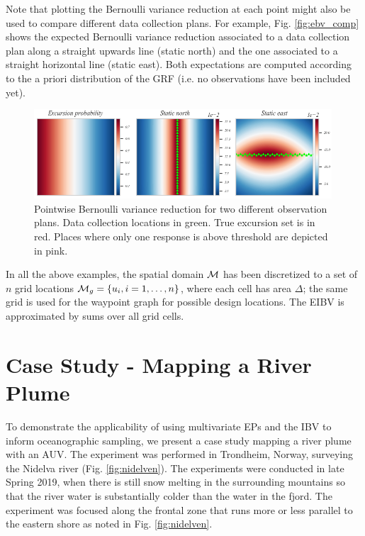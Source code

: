 \documentclass[aoas]{imsart}
\begin{document}
Note that plotting the Bernoulli variance reduction at each point might also be used to compare different data collection plans. For example, Fig. \ref{fig:ebv_comp} shows the expected Bernoulli variance reduction associated to a data collection plan along a straight upwards line (static north) and the one associated to a straight horizontal line (static east). Both expectations are computed according to the a priori distribution of the GRF (i.e. no observations have been included yet).

\begin{figure}[h!] \centering
  \includegraphics[width=0.99\textwidth]{Figures/ebv_north_vs_east.png}
  \caption{Pointwise Bernoulli variance reduction for two different observation plans. Data collection locations in green. True excursion set is in red. Places where only one response is above threshold are depicted in pink.}
\label{fig:ebv_north_vs_east}
\end{figure}

\begin{remark}
In all the above examples, the spatial domain $\mathcal{M}$ has been discretized to a set of $n$ grid
locations $\mathcal{M}_g = \{u_i, i=1,\ldots,n \}$, where each cell
has area $\Delta$; the same grid is used for the waypoint graph for
possible design locations. The EIBV is approximated by sums over all
grid cells.
\end{remark}









\section{Case Study - Mapping a River Plume}
\label{sec:case_study}

To demonstrate the applicability of using multivariate EPs and the IBV
to inform oceanographic sampling, we present a case study mapping a
river plume with an AUV. The experiment was performed in Trondheim,
Norway, surveying the Nidelva river (Fig. \ref{fig:nidelven}). The
experiments were conducted in late Spring 2019, when there is still
snow melting in the surrounding mountains so that the river water is
substantially colder than the water in the fjord. The experiment was
focused along the frontal zone that runs more or less parallel to the
eastern shore as noted in Fig. \ref{fig:nidelven}.
\end{document}
